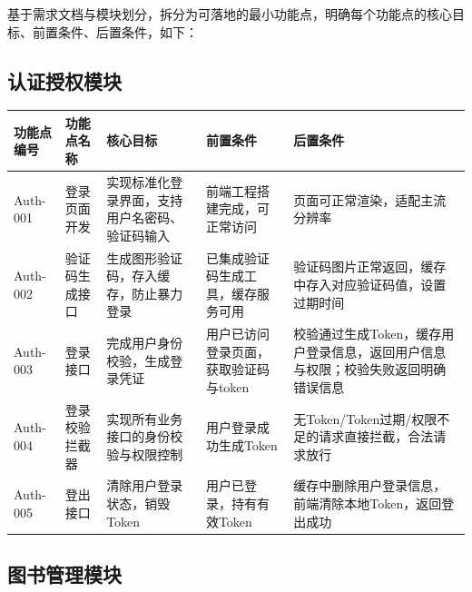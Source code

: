 \documentclass[12pt, a4paper]{article}
\begin{document}
基于需求文档与模块划分，拆分为可落地的最小功能点，明确每个功能点的核心目标、前置条件、后置条件，如下：

\subsection{认证授权模块}

\begin{table}[H]
    \centering
    \begin{tabularx}{\linewidth}{|l|l|X|X|X|}
        \hline
        功能点编号 & 功能点名称 & 核心目标 & 前置条件 & 后置条件 \\
        \hline
        Auth-001 & 登录页面开发 & 实现标准化登录界面，支持用户名密码、验证码输入 & 前端工程搭建完成，可正常访问 & 页面可正常渲染，适配主流分辨率 \\
        \hline
        Auth-002 & 验证码生成接口 & 生成图形验证码，存入缓存，防止暴力登录 & 已集成验证码生成工具，缓存服务可用 & 验证码图片正常返回，缓存中存入对应验证码值，设置过期时间 \\
        \hline
        Auth-003 & 登录接口 & 完成用户身份校验，生成登录凭证 & 用户已访问登录页面，获取验证码与token & 校验通过生成Token，缓存用户登录信息，返回用户信息与权限；校验失败返回明确错误信息 \\
        \hline
        Auth-004 & 登录校验拦截器 & 实现所有业务接口的身份校验与权限控制 & 用户登录成功生成Token & 无Token/Token过期/权限不足的请求直接拦截，合法请求放行 \\
        \hline
        Auth-005 & 登出接口 & 清除用户登录状态，销毁Token & 用户已登录，持有有效Token & 缓存中删除用户登录信息，前端清除本地Token，返回登出成功 \\
        \hline
    \end{tabularx}
\end{table}

\newpage
\subsection{图书管理模块}
\end{document}
